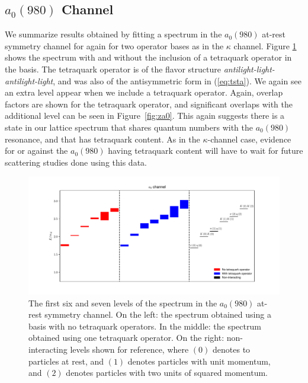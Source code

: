 \subsection{$a_0(980)$ Channel}
We summarize results obtained by fitting a spectrum in the $a_0(980)$ at-rest symmetry channel for again for two operator bases as in the $\kappa$ channel. Figure \ref{fig:a0_spectrum} shows the spectrum with and without the inclusion of a tetraquark operator in the basis. The tetraquark operator is of the flavor structure \textit{antilight-light-antilight-light}, and was also of the antisymmetric form in (\ref{eq:tsta}). We again see an extra level appear when we include a tetraquark operator. Again, overlap factors are shown for the tetraquark operator, and significant overlaps with the additional level can be seen in Figure~\ref{fig:za0}. This again suggests there is a state in our lattice spectrum that shares quantum numbers with the $a_0(980)$ resonance, and that has tetraquark content. As in the $\kappa$-channel case, evidence for or against the $a_0(980)$ having tetraquark content will have to wait for future scattering studies done using this data.
\begin{figure}
  \includegraphics[scale=0.6]{figures/a1gm_staircase.pdf}
  \caption{The first six and seven levels of the spectrum in the $a_0(980)$ at-rest symmetry channel. On the left: the spectrum obtained using a basis with no tetraquark operators. In the middle: the spectrum obtained using one tetraquark operator. On the right: non-interacting levels shown for reference, where $(0)$ denotes to particles at rest, and $(1)$ denotes particles with unit momentum, and $(2)$ denotes particles with two units of squared momentum.}\label{fig:a0_spectrum}
\end{figure}
